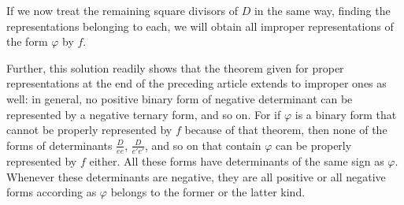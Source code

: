 If we now treat the remaining square divisors of $D$ in the same
way, finding the representations belonging to each, we will obtain all
improper representations of the form $\varphi$ by $f$.

Further, this solution readily shows that the theorem given for proper
representations at the end of the preceding article extends to improper
ones as well: in general, no positive binary form of negative determinant
can be represented by a negative ternary form, and so on. For if $\varphi$
is a binary form that cannot be properly represented by $f$ because
of that theorem, then none of the forms of determinants $\frac{D}{ee}$, $\frac{D}{e'e'}$,
and so on that contain $\varphi$ can be properly represented by $f$
either. All these forms have determinants of the same sign as $\varphi$.
Whenever these determinants are negative, they are all positive or all
negative forms according as $\varphi$ belongs to the former or the latter kind.

